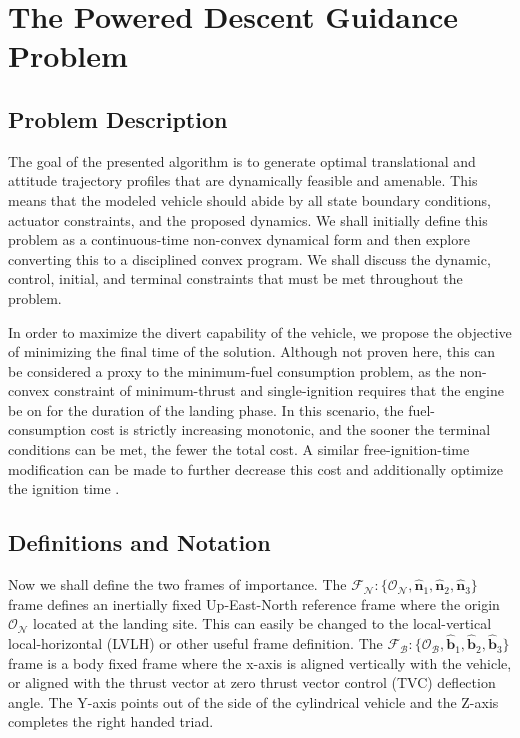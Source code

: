 \chapter{The Powered Descent Guidance Problem}
\label{mathchapter}

\section{Problem Description}
The goal of the presented algorithm is to generate optimal translational and attitude trajectory profiles that are dynamically feasible and amenable. This means that the modeled vehicle should abide by all state boundary conditions, actuator constraints, and the proposed dynamics. We shall initially define this problem as a continuous-time non-convex dynamical form and then explore converting this to a disciplined convex program. We shall discuss the dynamic, control, initial, and terminal constraints that must be met throughout the problem.

In order to maximize the divert capability of the vehicle, we propose the objective of minimizing the final time of the solution. Although not proven here, this can be considered a proxy to the minimum-fuel consumption problem, as the non-convex constraint of minimum-thrust and single-ignition requires that the engine be on for the duration of the landing phase. In this scenario, the fuel-consumption cost is strictly increasing monotonic, and the sooner the terminal conditions can be met, the fewer the total cost. A similar free-ignition-time modification can be made to further decrease this cost  and additionally optimize the ignition time \cite{szmuk2019successive}. 

\section{Definitions and Notation}

Now we shall define the two frames of importance. The $\mathcal{F}_\mathcal{N} : \{\mathcal{O}_\mathcal{N}, \hat{\bm{n}}_1, \hat{\bm{n}}_2, \hat{\bm{n}}_3 \}$ frame defines an inertially fixed Up-East-North reference frame where the origin $\mathcal{O}_\mathcal{N}$ located at the landing site. This can easily be changed to the local-vertical local-horizontal (LVLH) or other useful frame definition. The $\mathcal{F}_\mathcal{B}: \{\mathcal{O}_\mathcal{B}, \hat{\bm{b}}_1, \hat{\bm{b}}_2, \hat{\bm{b}}_3 \}$ frame is a body fixed frame where the x-axis is aligned vertically with the vehicle, or aligned with the thrust vector at zero thrust vector control (TVC) deflection angle. The Y-axis points out of the side of the cylindrical vehicle and the Z-axis completes the right handed triad.

